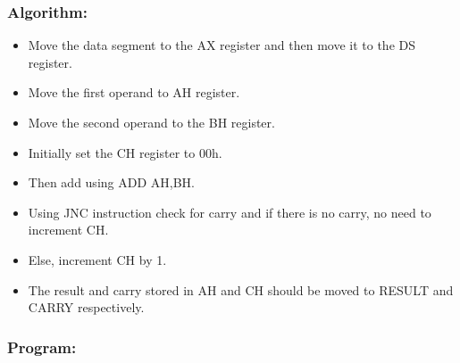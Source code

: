 \documentclass[12pt,a4paper]{article}
\begin{document}
\begin{flushleft}
\subsubsection*{\textbf{Algorithm:}}
\begin{itemize}
    \item Move the data segment to the AX register and then move it to the DS register.
    \item Move the first operand to AH register. 
    \item Move the second operand to the BH register. 
    \item Initially set the CH register to 00h. 
    \item Then add using ADD AH,BH.
    \item Using JNC instruction check for carry and if there is no carry, no need to increment CH.
    \item Else, increment CH by 1. 
    \item The result and carry stored in AH and CH should be moved to RESULT
and CARRY respectively.
\end{itemize}

\newpage
\subsubsection*{\textbf{Program:}}


\end{flushleft}
\end{document}
